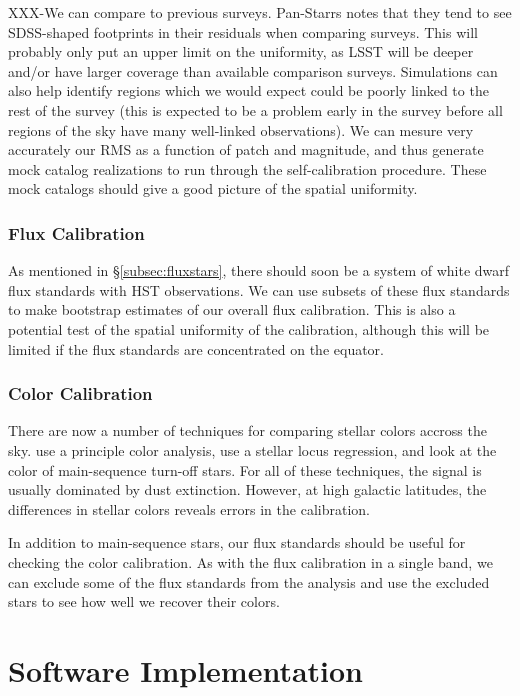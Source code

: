 \documentclass[12pt,preprint]{aastex}
\begin{document}
XXX-We can compare to previous surveys.  Pan-Starrs notes that they
tend to see SDSS-shaped footprints in their residuals when comparing
surveys.  This will probably only put an upper limit on the
uniformity, as LSST will be deeper and/or have larger coverage than
available comparison surveys.  Simulations can also help identify
regions which we would expect could be poorly linked to the rest of
the survey (this is expected to be a problem early in the survey
before all regions of the sky have many well-linked observations).  We
can mesure very accurately our RMS as a function of patch and
magnitude, and thus generate mock catalog realizations to run through
the self-calibration procedure.  These mock catalogs should give a
good picture of the spatial uniformity.

\subsubsection{Flux Calibration}

As mentioned in \S\ref{subsec:fluxstars}, there should soon be a
system of white dwarf flux standards with HST observations.  We can
use subsets of these flux standards to make bootstrap estimates of our
overall flux calibration.  This is also a potential test of the
spatial uniformity of the calibration, although this will be limited
if the flux standards are concentrated on the equator.

\subsubsection{Color Calibration}

There are now a number of techniques for comparing stellar colors
accross the sky.  \citet{Ivezic04} use a principle color analysis,
\citet{High09} use a stellar locus regression, and \citet{Schlafly10}
look at the color of main-sequence turn-off stars.  For all of these
techniques, the signal is usually dominated by dust extinction.
However, at high galactic latitudes, the differences in stellar colors
reveals errors in the calibration.

In addition to main-sequence stars, our flux standards should be
useful for checking the color calibration.  As with the flux
calibration in a single band, we can exclude some of the flux
standards from the analysis and use the excluded stars to see how
well we recover their colors.


\section{Software Implementation}
\label{sec:software}
\end{document}
